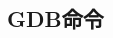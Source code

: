 \documentclass[class=book, crop=false]{standalone}
\begin{document}
\begin{CJK}{UTF8}{gbsn}

\chapter{GDB命令}









\cleardoublepage

\end{CJK}
\end{document}
